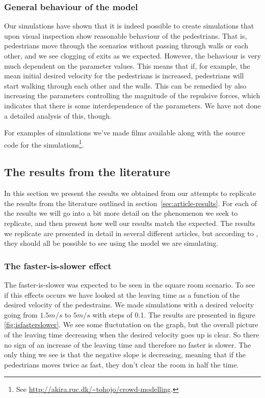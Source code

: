\subsubsection{General behaviour of the model}
Our simulations have shown that it is indeed possible to create simulations 
that upon visual inspection show reasonable behaviour of the pedestrians. That 
is, pedestrians move through the scenarios without passing through walls or 
each other, and we see clogging of exits as we expected. However, the 
behaviour is very much dependent on the parameter values. This means that if, 
for example, the mean initial desired velocity for the pedestrians is 
increased, pedestrians will start walking through each other and the walls.  
This can be remedied by also increasing the parameters controlling the 
magnitude of the repulsive forces, which indicates that there is some 
interdependence of the parameters. We have not done a detailed analysis of 
this, though.

For examples of simulations we've made films available along with the source 
code for the simulations\footnote{See 
\url{http://akira.ruc.dk/~tohojo/crowd-modelling}.}.

\subsection{The results from the literature}\label{subsec:ThePhenomena}
In this section we present the results we obtained from our attempts
to replicate the results from the literature outlined in 
section~\ref{sec:article-results}.  For each of the results we will go into a 
bit more detail on the phenomenon we seek to replicate, and then present how 
well our results match the expected. The results we replicate are presented in 
detail in several different articles, but according to \cite{self-org}, they 
should all be possible to see using the model we are simulating.

\subsubsection{The faster-is-slower effect}
The faster-is-slower was expected to be seen in the square room scenario.
To see if this effects occurs we have looked at the leaving time as a function
of the desired velocity of the pedestrains. We made simulations with a desired
velocity going from $1.5m/s$ to $5m/s$ with steps of 0.1. The results are presented
in figure \ref{fig:isfasterslower}. We see some fluctutation on the graph, but the
overall picture of the leaving time decreasing when the desired velocity goes up is
clear. So there no sign of an increase of the leaving time and therefore no faster
is slower. The only thing we see is that the negative slope is decreasing, meaning
that if the pedestrians moves twice as fast, they don't clear the room in half the
time.

